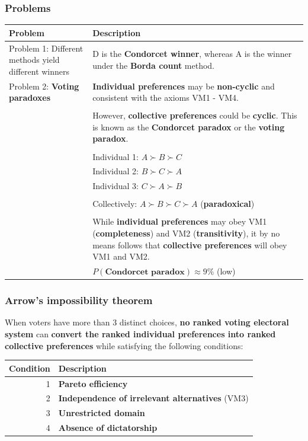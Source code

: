 \documentclass[11pt]{article}
\begin{document}
\subsubsection{Problems}
\label{sec:org2bc149b}
\begin{center}
\begin{tabular}{|m{8em}|m{25em}|}
\hline
Problem & Description\\
\hline
Problem 1: Different methods yield different winners & D is the \textbf{Condorcet winner}, whereas A is the winner under the \textbf{Borda count} method.\\
\hline
Problem 2: \textbf{Voting paradoxes} & \textbf{Individual preferences} may be \textbf{non-cyclic} and consistent with the axioms VM1 - VM4.\\
 & \\
 & However, \textbf{collective preferences} could be \textbf{cyclic}. This is known as the \textbf{Condorcet paradox} or the \textbf{voting paradox}.\\
 & \\
 & Individual 1: \(A \succ B \succ C\)\\
 & Individual 2: \(B \succ C \succ A\)\\
 & Individual 3: \(C \succ A \succ B\)\\
 & \\
 & Collectively: \(A \succ B \succ C \succ A\) (\textbf{paradoxical})\\
 & \\
 & While \textbf{individual preferences} may obey VM1 (\textbf{completeness}) and VM2 (\textbf{transitivity}), it by no means follows that \textbf{collective preferences} will obey VM1 and VM2.\\
 & \(P(\textbf{Condorcet paradox}) \approx 9\%\) (low)\\
\hline
\end{tabular}
\end{center}
\subsubsection{Arrow's impossibility theorem}
\label{sec:org0073d48}
When voters have more than 3 distinct choices, \textbf{no ranked voting electoral system} can \textbf{convert the ranked individual preferences into ranked collective preferences} while satisfying the following conditions:
\begin{center}
\begin{tabular}{r|l}
Condition & Description\\
\hline
1 & \textbf{Pareto efficiency}\\
2 & \textbf{Independence of irrelevant alternatives} (VM3)\\
3 & \textbf{Unrestricted domain}\\
4 & \textbf{Absence of dictatorship}\\
\end{tabular}
\end{center}
\end{document}
